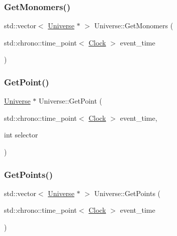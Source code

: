 \mbox{\label{classUniverse_aca82a914e0f8bd7cd1ec80a7220f0a0e}} 
\subsubsection{\texorpdfstring{Get\+Monomers()}{GetMonomers()}}
{\footnotesize\ttfamily std\+::vector$<$ \mbox{\hyperlink{classUniverse}{Universe}} $\ast$ $>$ Universe\+::\+Get\+Monomers (\begin{DoxyParamCaption}\item[{std\+::chrono\+::time\+\_\+point$<$ \mbox{\hyperlink{universe_8h_a0ef8d951d1ca5ab3cfaf7ab4c7a6fd80}{Clock}} $>$}]{event\+\_\+time }\end{DoxyParamCaption})}

\mbox{\label{classUniverse_a3774f14a13a55827a1a4eea0a404edcb}} 
\subsubsection{\texorpdfstring{Get\+Point()}{GetPoint()}}
{\footnotesize\ttfamily \mbox{\hyperlink{classUniverse}{Universe}} $\ast$ Universe\+::\+Get\+Point (\begin{DoxyParamCaption}\item[{std\+::chrono\+::time\+\_\+point$<$ \mbox{\hyperlink{universe_8h_a0ef8d951d1ca5ab3cfaf7ab4c7a6fd80}{Clock}} $>$}]{event\+\_\+time,  }\item[{int}]{selector }\end{DoxyParamCaption})}

\mbox{\label{classUniverse_a765c6c658b7a465cd92418690db846ae}} 
\subsubsection{\texorpdfstring{Get\+Points()}{GetPoints()}}
{\footnotesize\ttfamily std\+::vector$<$ \mbox{\hyperlink{classUniverse}{Universe}} $\ast$ $>$ Universe\+::\+Get\+Points (\begin{DoxyParamCaption}\item[{std\+::chrono\+::time\+\_\+point$<$ \mbox{\hyperlink{universe_8h_a0ef8d951d1ca5ab3cfaf7ab4c7a6fd80}{Clock}} $>$}]{event\+\_\+time }\end{DoxyParamCaption})}

